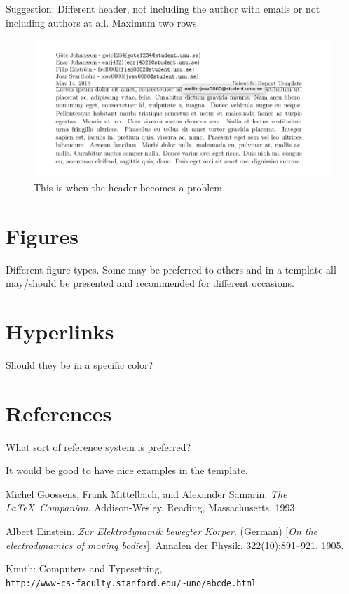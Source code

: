 Suggestion: Different header, not including the author with emails or not including authors at all. Maximum two rows.

\begin{figure}[H]
    \centering
    \includegraphics[width=0.8\linewidth]{Figures/Ugly_header.png}
    \caption{This is when the header becomes a problem.}
    \label{Fig:UglyHeader}
\end{figure}

\section{Figures}
Different figure types. Some may be preferred to others and in a template all may/should be presented and recommended for different occasions.


\section{Hyperlinks}
Should they be in a specific color?

\section{References}
What sort of reference system is preferred? \cite{einstein}

It would be good to have nice examples in the template. \cite{latexcompanion}



\begin{thebibliography}{9}
Michel Goossens, Frank Mittelbach, and Alexander Samarin.
\textit{The \LaTeX\ Companion}.
Addison-Wesley, Reading, Massachusetts, 1993.

Albert Einstein.
\textit{Zur Elektrodynamik bewegter K{\"o}rper}. (German)
[\textit{On the electrodynamics of moving bodies}].
Annalen der Physik, 322(10):891–921, 1905.

Knuth: Computers and Typesetting,
\\\texttt{http://www-cs-faculty.stanford.edu/\~{}uno/abcde.html}
\end{thebibliography}


